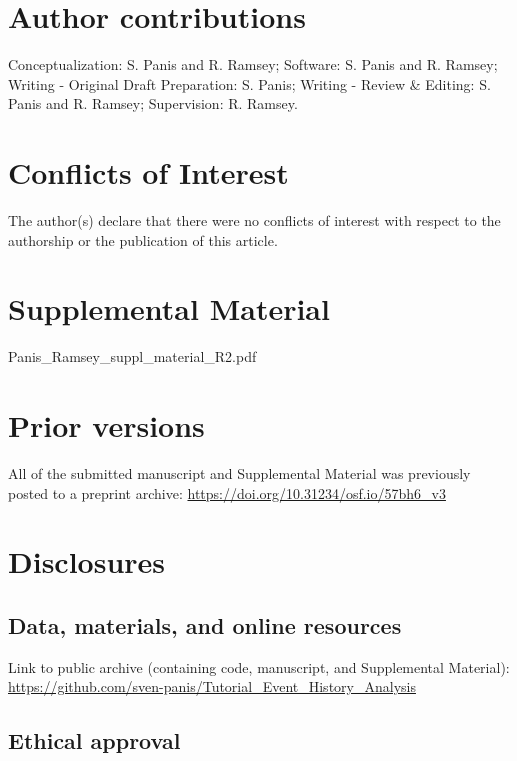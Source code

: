 \documentclass[
  english,
  man, donotrepeattitle,floatsintext]{apa6}
\begin{document}
\normalsize

\newpage

\section{Author contributions}\label{author-contributions}

Conceptualization: S. Panis and R. Ramsey; Software: S. Panis and R. Ramsey; Writing - Original Draft Preparation: S. Panis; Writing - Review \& Editing: S. Panis and R. Ramsey; Supervision: R. Ramsey.

\section{Conflicts of Interest}\label{conflicts-of-interest}

The author(s) declare that there were no conflicts of interest with respect to the authorship or the publication of this article.

\section{Supplemental Material}\label{supplemental-material}

Panis\_Ramsey\_suppl\_material\_R2.pdf

\section{Prior versions}\label{prior-versions}

All of the submitted manuscript and Supplemental Material was previously posted to a preprint archive: \url{https://doi.org/10.31234/osf.io/57bh6_v3}

\section{Disclosures}\label{disclosures}

\subsection{Data, materials, and online resources}\label{data-materials-and-online-resources}

Link to public archive (containing code, manuscript, and Supplemental Material): \url{https://github.com/sven-panis/Tutorial_Event_History_Analysis}

\subsection{Ethical approval}\label{ethical-approval}
\end{document}
